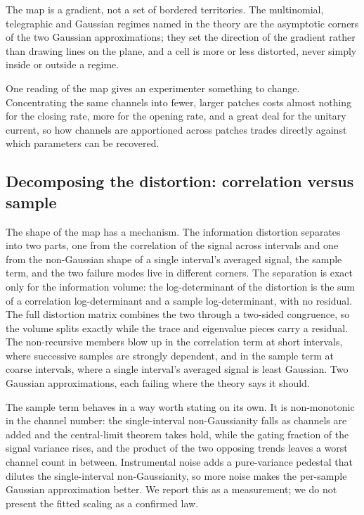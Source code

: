 The map is a gradient, not a set of bordered territories. The multinomial, telegraphic and Gaussian regimes named in the theory are the asymptotic corners of the two Gaussian approximations; they set the direction of the gradient rather than drawing lines on the plane, and a cell is more or less distorted, never simply inside or outside a regime.

One reading of the map gives an experimenter something to change. Concentrating the same channels into fewer, larger patches costs almost nothing for the closing rate, more for the opening rate, and a great deal for the unitary current, so how channels are apportioned across patches trades directly against which parameters can be recovered. 

\subsection*{Decomposing the distortion: correlation versus sample}

The shape of the map has a mechanism. The information distortion separates into two parts, one from the correlation of the signal across intervals and one from the non-Gaussian shape of a single interval's averaged signal, the sample term, and the two failure modes live in different corners. The separation is exact only for the information volume: the log-determinant of the distortion is the sum of a correlation log-determinant and a sample log-determinant, with no residual. The full distortion matrix combines the two through a two-sided congruence, so the volume splits exactly while the trace and eigenvalue pieces carry a residual. %
The non-recursive members blow up in the correlation term at short intervals, where successive samples are strongly dependent, and in the sample term at coarse intervals, where a single interval's averaged signal is least Gaussian. 
Two Gaussian approximations, each failing where the theory says it should.

The sample term behaves in a way worth stating on its own. It is non-monotonic in the channel number: the single-interval non-Gaussianity falls as channels are added and the central-limit theorem takes hold, while the gating fraction of the signal variance rises, and the product of the two opposing trends leaves a worst channel count in between. Instrumental noise adds a pure-variance pedestal that dilutes the single-interval non-Gaussianity, so more noise makes the per-sample Gaussian approximation better.  %
We report this as a measurement; we do not present the fitted scaling as a confirmed law.

